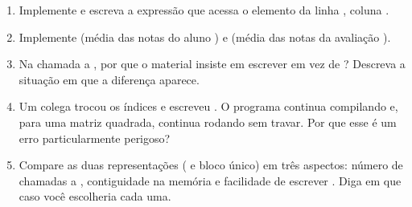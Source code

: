 \documentclass[11pt,a4paper]{article}
\begin{document}
\begin{enumerate}[label=(\alph*),leftmargin=1.8em,itemsep=1pt]
  \item Implemente  e escreva a expressão que acessa o elemento da
        linha , coluna .
  \item Implemente  (média das  notas do aluno ) e
         (média das  notas da avaliação ).
  \item Na chamada a , por que o material insiste em escrever
         em vez de ?
        Descreva a situação em que a diferença aparece.
  \item Um colega trocou os índices e escreveu . O programa
        continua compilando e, para uma matriz quadrada, continua rodando sem
        travar. Por que esse é um erro particularmente perigoso?
  \item Compare as duas representações ( e bloco único) em três
        aspectos: número de chamadas a , contiguidade na memória e
        facilidade de escrever . Diga em que caso você escolheria cada uma.
\end{enumerate}
\end{document}
